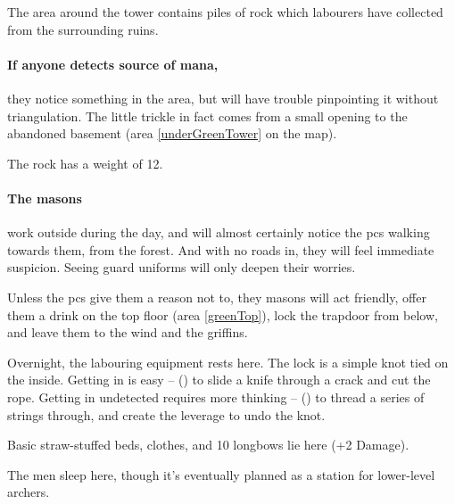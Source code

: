
The area around the tower contains piles of rock which labourers have collected from the surrounding ruins.

\paragraph{If anyone detects source of mana,}
they notice something in the area, but will have trouble pinpointing it without triangulation.
The little trickle in fact comes from a small opening to the abandoned basement (area \ref{underGreenTower} on the map).

The rock has a \gls{weight} of 12.

\paragraph{The masons}
work outside during the day, and will almost certainly notice the \glspl{pc} walking towards them, from the forest.
And with no roads in, they will feel immediate suspicion.
Seeing \gls{guard} uniforms will only deepen their worries.

Unless the \glspl{pc} give them a reason not to, they masons will act friendly, offer them a drink on the top floor (area \ref{greenTop}), lock the trapdoor from below, and leave them to the wind and the griffins.%



Overnight, the labouring equipment rests here.
The lock is a simple knot tied on the inside.
Getting in is easy --  (\tn[6]) to slide a knife through a crack and cut the rope.
Getting in undetected requires more thinking --  (\tn[14]) to thread a series of strings through, and create the leverage to undo the knot.

\southSeeker


Basic straw-stuffed beds, clothes, and 10 longbows lie here (+2 Damage).


The men sleep here, though it's eventually planned as a station for lower-level archers.


